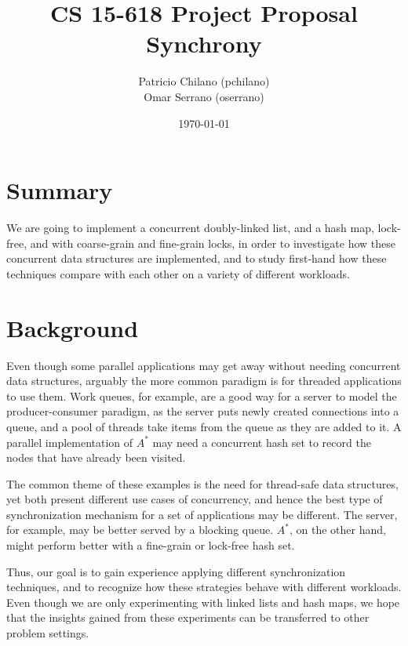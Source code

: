\documentclass[11pt]{article}
\title{\vspace{-25pt}
\huge CS 15-618 Project Proposal \\
\huge Synchrony
}
\author{
    Patricio Chilano (pchilano) \\
    Omar Serrano (oserrano)
}
\date{\today}
\begin{document}


\maketitle

\section*{Summary}
We are going to implement a concurrent doubly-linked list, and a hash map,
lock-free, and with coarse-grain and fine-grain locks, in order to
investigate how these concurrent data structures are implemented, and to study
first-hand how these techniques compare with each other on a variety of
different workloads.

\section*{Background}
Even though some parallel applications may get away without needing concurrent
data structures, arguably the more common paradigm is for threaded applications
to use them. Work queues, for example, are a good way for a server to model the
producer-consumer paradigm, as the server puts newly created connections into a
queue, and a pool of threads take items from the queue as they are added to it.
A parallel implementation of $A^*$ may need a concurrent hash set to record the
nodes that have already been visited.

The common theme of these examples is the need for thread-safe data structures,
yet both present different use cases of concurrency, and hence the best type of
synchronization mechanism for a set of applications may be different. The
server, for example, may be better served by a blocking queue. $A^*$, on the
other hand, might perform better with a fine-grain or lock-free hash set.

Thus, our goal is to gain experience applying different synchronization
techniques, and to recognize how these strategies behave with different
workloads. Even though we are only experimenting with linked lists and hash
maps, we hope that the insights gained from these experiments can be transferred
to other problem settings.
\end{document}

